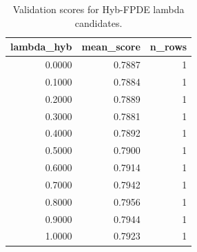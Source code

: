 \begin{table}[t]
\caption{Validation scores for Hyb-FPDE lambda candidates.}
\label{tab:lambda_distribution_computed}
\centering
\begin{tabular}{rrr}
\toprule
lambda\_hyb & mean\_score & n\_rows \\
\midrule
0.0000 & 0.7887 & 1 \\
0.1000 & 0.7884 & 1 \\
0.2000 & 0.7889 & 1 \\
0.3000 & 0.7881 & 1 \\
0.4000 & 0.7892 & 1 \\
0.5000 & 0.7900 & 1 \\
0.6000 & 0.7914 & 1 \\
0.7000 & 0.7942 & 1 \\
0.8000 & 0.7956 & 1 \\
0.9000 & 0.7944 & 1 \\
1.0000 & 0.7923 & 1 \\
\bottomrule
\end{tabular}

\end{table}
